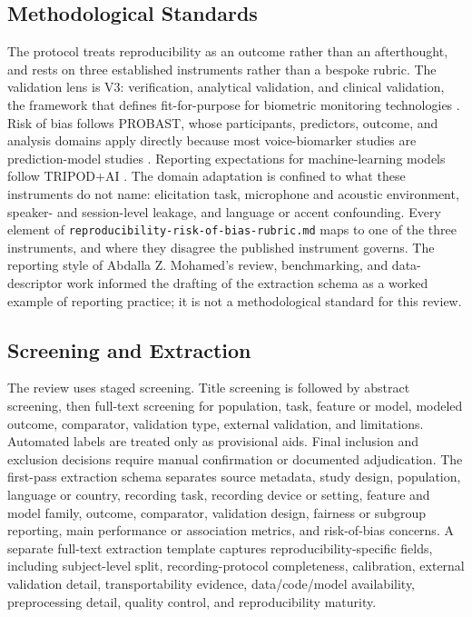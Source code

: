 \documentclass[11pt]{article}
\begin{document}
\subsection{Methodological Standards}

The protocol treats reproducibility as an outcome rather than an afterthought, and rests on three established instruments rather than a bespoke rubric. The validation lens is V3: verification, analytical validation, and clinical validation, the framework that defines fit-for-purpose for biometric monitoring technologies \citep{goldsack2020v3}. Risk of bias follows PROBAST, whose participants, predictors, outcome, and analysis domains apply directly because most voice-biomarker studies are prediction-model studies \citep{wolff2019probast}. Reporting expectations for machine-learning models follow TRIPOD+AI \citep{collins2024tripodai}. The domain adaptation is confined to what these instruments do not name: elicitation task, microphone and acoustic environment, speaker- and session-level leakage, and language or accent confounding. Every element of \texttt{reproducibility-risk-of-bias-rubric.md} maps to one of the three instruments, and where they disagree the published instrument governs. The reporting style of Abdalla Z. Mohamed's review, benchmarking, and data-descriptor work \citep{mohamed2023objective,mohamed2024functional,mohamed2026aspire} informed the drafting of the extraction schema as a worked example of reporting practice; it is not a methodological standard for this review.

\subsection{Screening and Extraction}

The review uses staged screening. Title screening is followed by abstract screening, then full-text screening for population, task, feature or model, modeled outcome, comparator, validation type, external validation, and limitations. Automated labels are treated only as provisional aids. Final inclusion and exclusion decisions require manual confirmation or documented adjudication. The first-pass extraction schema separates source metadata, study design, population, language or country, recording task, recording device or setting, feature and model family, outcome, comparator, validation design, fairness or subgroup reporting, main performance or association metrics, and risk-of-bias concerns. A separate full-text extraction template captures reproducibility-specific fields, including subject-level split, recording-protocol completeness, calibration, external validation detail, transportability evidence, data/code/model availability, preprocessing detail, quality control, and reproducibility maturity.
\end{document}
